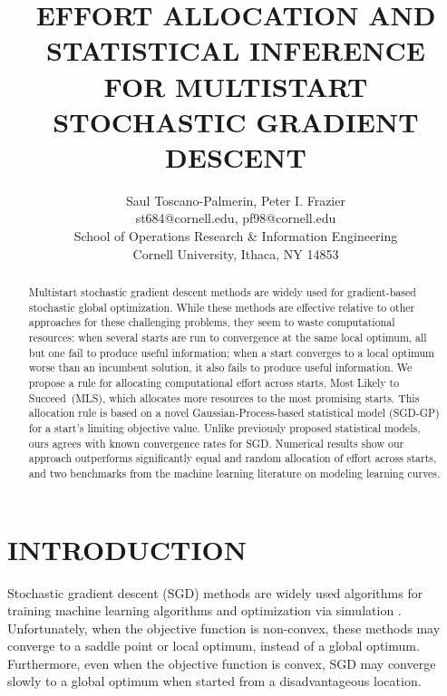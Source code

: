 \documentclass[12pt,english]{article}
\date{}
\newcommand{\abbrv}{MLS}
\newcommand{\name}{Most Likely to Succeed}
\begin{document}
\title{EFFORT ALLOCATION AND STATISTICAL INFERENCE\\ FOR MULTISTART STOCHASTIC GRADIENT DESCENT}


\author{Saul Toscano-Palmerin, Peter I. Frazier\\
st684@cornell.edu, pf98@cornell.edu\\
School of Operations Research \& Information Engineering\\
Cornell University, Ithaca, NY 14853\\
}


\maketitle



\begin{abstract} 
Multistart stochastic gradient descent methods are widely used for gradient-based stochastic global optimization.  While these methods are effective relative to other approaches for these challenging problems, they seem to waste computational resources: when several starts are run to convergence at the same local optimum, all but one fail to produce useful information; when a start converges to a local optimum worse than an incumbent solution, it also fails to produce useful information.  
We propose a rule for allocating computational effort across starts, \name\ (\abbrv), which allocates more resources to the most promising starts.  This allocation rule is based on a novel Gaussian-Process-based statistical model (SGD-GP) for a start's limiting objective value.  Unlike previously proposed statistical models, ours agrees with known convergence rates for SGD. Numerical results show our approach outperforms significantly equal and random allocation of effort across starts, and two benchmarks from the machine learning literature on modeling learning curves.
\end{abstract}


\section{INTRODUCTION}
\label{sec:intro}

Stochastic gradient descent (SGD) methods \citep{sgd:Nemirovski,adam} are widely used algorithms for training machine learning algorithms \citep{cnn_cifar,murphy2012machine} and optimization via simulation \citep{fu2015}.
Unfortunately, when the objective function is non-convex, these methods may converge to a saddle point or local optimum, instead of a global optimum. Furthermore, even when the objective function is convex, SGD may converge slowly to a global optimum when started from a disadvantageous location. 
\end{document}

